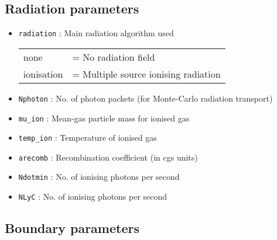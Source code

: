 \documentclass[a4paper]{article}
\newcommand{\var}[1]{\texttt{#1}}
\begin{document}
\subsection{Radiation parameters}

\begin{itemize}

\item \var{radiation} : Main radiation algorithm used \\
\begin{tabular}{ll}
none            &= No radiation field \\
ionisation      &= Multiple source ionising radiation
\end{tabular}

\item \var{Nphoton}   : No. of photon packets (for Monte-Carlo radiation transport)
\item \var{mu\_ion}   : Mean-gas particle mass for ionised gas
\item \var{temp\_ion} : Temperature of ionised gas
\item \var{arecomb}   : Recombination coefficient (in cgs units)
\item \var{Ndotmin}   : No. of ionising photons per second
\item \var{NLyC}      : No. of ionising photons per second

\end{itemize}



\subsection{Boundary parameters}
\end{document}

